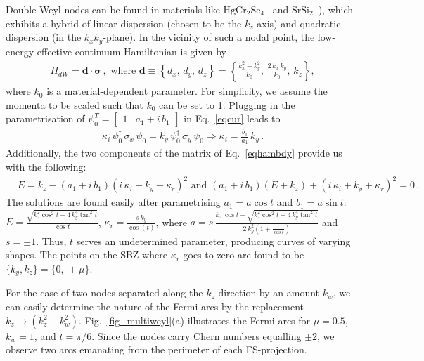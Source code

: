\documentclass[aps,prb,onecolumn, footinbib, 10pt]{revtex4-2}
\begin{document}
Double-Weyl nodes can be found in materials like $\mathrm{HgCr_2Se_4}$~\cite{Gang2011} and $\mathrm{SrSi_2}$~\cite{hasan_mweyl16, singh18_tunable}), which exhibits a hybrid of linear dispersion (chosen to be the $k_z$-axis) and quadratic dispersion (in the $k_x k_y$-plane). In the vicinity of such a nodal point, the low-energy effective continuum Hamiltonian is given by \cite{bernevig,bernevig2, fu22_thermoelectric, ips_rahul_ph_strain, ips-ruiz, ips-tilted, chen16_thermoelectric}
\begin{align}
\label{eqhamdw}
H_{dW} = \boldsymbol{d} \cdot \boldsymbol{\sigma}  \,, \text{ where }
\boldsymbol{d} \equiv \left\{ d_x,\, d_y, \, d_z \right\} = \left\{
\frac{k_x^2-k_y^2} {k_0} , \, \frac{2 \,k_x \,k_y} {k_0} ,\, k_z\right\} ,
\end{align}
where $k_0$ is a material-dependent parameter. For simplicity, we assume the momenta to be scaled such that $k_0$ can be set to 1.
Plugging in the parametrisation of $ \psi_0^T  = \begin{bmatrix}
1 & a_1 +i \, b_1 \end{bmatrix}$ in Eq.~\eqref{eqcur} leads to
\begin{align}
\label{eq29}
\kappa_i \,\psi_0^\dagger\, \sigma_x \, \psi_0 
=k_y \, \psi_0^\dagger\, \sigma_y \, \psi_0 \Rightarrow
 \kappa_i = \frac{b_1}{a_1} \,k_y \,.
\end{align}
Additionally, the two components of the matrix of Eq.~\eqref{eqhambdy} provide us with the following:
\begin{align}
&  E = k_z- \left(a_1+i\, b_1\right) \left(i \,\kappa _i-k_y+\kappa _r \right)^2
 \text{ and }
\left(a_1+i \,b_1\right) \left( E + k_z\right)+\left(i \,\kappa _i+k_y+\kappa _r\right)^2 = 0 \,.
\end{align}
The solutions are found easily after parametrising $ a_1 = a \cos t$ and $ b_1 = a \sin t$:
$E = \frac{\sqrt{k_z^2 \cos^2  t-4 \,k_y^4 \tan ^2 t }}
{\cos t}$, $ \kappa _r =  \frac{ s \, k_y}{\cos (t)} $, where
$a = s \, \frac{ k_z \,\cos t-\sqrt{k_z^2 \cos ^2 t-4 \,k_y^4 \tan^2 t} }
{2\, k_y^2 \left( 1 + \frac{1}{\cos t} \right)}$ and $s = \pm 1$.
Thus, $t$ serves an undetermined parameter, producing curves of varying shapes. The points on the SBZ where $\kappa_r$ goes to zero are found to be $\lbrace k_y, k_z \rbrace = \lbrace  0,\, \pm \mu \rbrace $.

For the case of two nodes separated along the $ k_z$-direction by an amount $k_w$, we can easily determine the nature of the Fermi arcs by the replacement $ k_z \rightarrow (k_z^2 - k_w^2)$. Fig.~\ref{fig_multiweyl}(a) illustrates the Fermi arcs for $\mu=0.5$, $k_w =1$, and $ t = \pi/6 $. Since the nodes carry Chern numbers equalling $\pm 2$, we observe two arcs emanating from the perimeter of each FS-projection.
\end{document}
